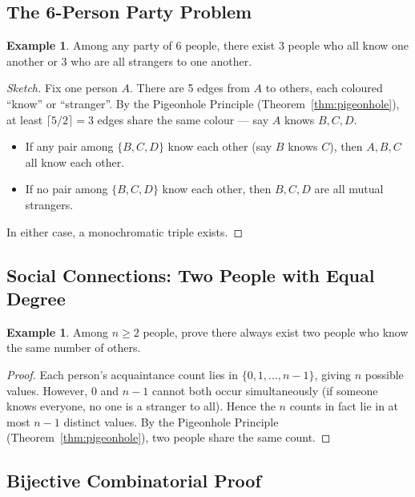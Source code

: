 \documentclass[11pt, a4paper, notitlepage]{report}
\theoremstyle{definition}
\newtheorem{example}[theorem]{Example}
\theoremstyle{remark}
\begin{document}
\subsection{The 6-Person Party Problem}

\begin{example}
Among any party of 6 people, there exist 3 people who all know one another or 3 who are all
strangers to one another.
\end{example}

\begin{proof}[Sketch]
Fix one person $A$. There are 5 edges from $A$ to others, each coloured ``know'' or ``stranger''.
By the Pigeonhole Principle (Theorem~\ref{thm:pigeonhole}), at least $\lceil 5/2 \rceil = 3$ edges
share the same colour — say $A$ knows $B, C, D$.
\begin{itemize}
  \item If any pair among $\{B, C, D\}$ know each other (say $B$ knows $C$), then $A, B, C$
        all know each other.
  \item If no pair among $\{B, C, D\}$ know each other, then $B, C, D$ are all mutual strangers.
\end{itemize}
In either case, a monochromatic triple exists.
\end{proof}

\subsection{Social Connections: Two People with Equal Degree}

\begin{example}
Among $n \geq 2$ people, prove there always exist two people who know the same number of others.
\end{example}

\begin{proof}
Each person's acquaintance count lies in $\{0, 1, \ldots, n-1\}$, giving $n$ possible values.
However, $0$ and $n-1$ cannot both occur simultaneously (if someone knows everyone, no one is a
stranger to all). Hence the $n$ counts in fact lie in at most $n-1$ distinct values. By the
Pigeonhole Principle (Theorem~\ref{thm:pigeonhole}), two people share the same count.
\end{proof}

\subsection{Bijective Combinatorial Proof}
\end{document}
